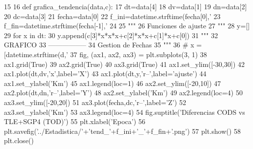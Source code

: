 \begin{DoxyCode}
15 
16 def grafica_tendencia(data,c):
17     dt=data[4]
18     dv=data[1]
19     dn=data[2]
20     dc=data[3]
21     fecha=data[0]    
22     f_ini=datetime.strftime(fecha[0],'%
23     f_fin=datetime.strftime(fecha[-1],'%
24     
25     """
26     Funciones de ajuste
27     """
28     y=[]
29     for x in dt:
30         y.append(c[3]*x*x*x+c[2]*x*x+c[1]*x+c[0])
31     """
32     GRAFICO
33     -----------------
34     Gestion de Fechas
35     """
36 #    x = [datetime.strftime(d,'%
37     fig, (ax1, ax2, ax3) = plt.subplots(3, 1)
38     ax1.grid(True)
39     ax2.grid(True)
40     ax3.grid(True)
41     ax1.set_ylim([-30,30])
42     ax1.plot(dt,dv,'x',label='X')
43     ax1.plot(dt,y,'r--',label='ajuste')    
44     ax1.set_ylabel('Km')
45     ax1.legend(loc=1)
46     ax2.set_ylim([-20,10])
47     ax2.plot(dt,dn,'r--',label='Y')    
48     ax2.set_ylabel('Km')
49     ax2.legend(loc=4)
50     ax3.set_ylim([-20,20])
51     ax3.plot(fecha,dc,'r--',label='Z')
52     ax3.set_ylabel('Km')   
53     ax3.legend(loc=4)
54     fig.suptitle('Diferencias CODS vs TLE+SGP4 (TOD)')
55     plt.xlabel('Epoca')
56     plt.savefig('../Estadistica/'+'tend_'+f_ini+'_'+f_fin+'.png')
57     plt.show()
58     plt.close()

\end{DoxyCode}
